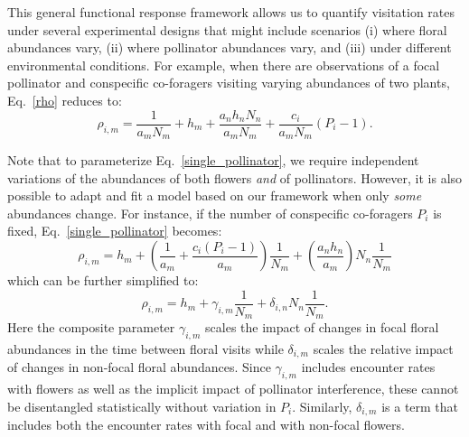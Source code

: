 \begin{refsection}
This general functional response framework allows us to quantify visitation rates under several experimental designs that might include scenarios (i) where floral abundances vary, (ii) where pollinator abundances vary, and (iii) under different environmental conditions.
For example, when there are observations of a focal pollinator and conspecific co-foragers visiting varying abundances of two plants, Eq.~\ref{rho} reduces to:
\begin{equation}
	\label{single_pollinator}
\rho_{i,m} = \frac{1}{a_{m}N_{m}}+ h_{m} + \frac{a_{n}h_{n}N_{n}}{a_{m}N_{m}} +\frac{c_{i}}{a_{m}N_{m}} (P_{i}-1)  \text{.}
\end{equation}

Note that to parameterize Eq.~\ref{single_pollinator}, we require independent variations of the abundances of both flowers \textit{and} of pollinators. However, it is also possible to adapt and fit a model based on our framework when only \emph{some} abundances change. For instance, if  the number of conspecific co-foragers $P_i$ is fixed, Eq.~\ref{single_pollinator} becomes:
\begin{equation}
	\label{single_pollinator_simple}
\rho_{i,m} =  h_{m} + \left ( \frac{1}{a_{m}} + \frac{c_{i}(P_{i}-1)}{a_{m}}\right ) \frac{1}{N_{m}} +  \left ( \frac{a_{n}h_{n}}{a_{m}}  \right ) N_{n} \frac{1}{N_{m}}
\end{equation}
which can be further simplified to:
\begin{equation}
	\rho_{i,m} = h_{m} + \gamma_{i,m} \frac{1}{N_{m}} + \delta_{i,n} N_{n} \frac{1}{N_{m}}  \text{.}
\end{equation}
Here the composite parameter $\gamma_{i,m}$ scales the impact of changes in focal floral abundances in the time between floral visits while $\delta_{i,m}$ scales the relative impact of changes in non-focal floral abundances. Since $\gamma_{i,m}$ includes encounter rates with flowers as well as the implicit impact of pollinator interference, these cannot be disentangled statistically without variation in $P_{i}$. Similarly, $\delta_{i,m}$ is a term that includes both the encounter rates with focal and with non-focal flowers.


\end{refsection}
